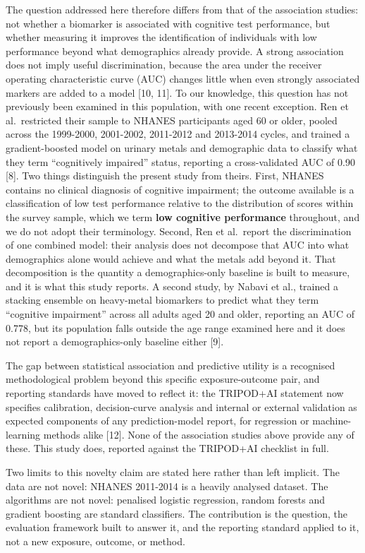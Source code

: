 \documentclass[12pt]{article}
\begin{document}
The question addressed here therefore differs from that of the association studies: not whether a biomarker is associated with cognitive test performance, but whether measuring it improves the identification of individuals with low performance beyond what demographics already provide. A strong association does not imply useful discrimination, because the area under the receiver operating characteristic curve (AUC) changes little when even strongly associated markers are added to a model [10, 11]. To our knowledge, this question has not previously been examined in this population, with one recent exception. Ren et al.\ restricted their sample to NHANES participants aged 60 or older, pooled across the 1999-2000, 2001-2002, 2011-2012 and 2013-2014 cycles, and trained a gradient-boosted model on urinary metals and demographic data to classify what they term ``cognitively impaired'' status, reporting a cross-validated AUC of 0.90 [8]. Two things distinguish the present study from theirs. First, NHANES contains no clinical diagnosis of cognitive impairment; the outcome available is a classification of low test performance relative to the distribution of scores within the survey sample, which we term \textbf{low cognitive performance} throughout, and we do not adopt their terminology. Second, Ren et al.\ report the discrimination of one combined model: their analysis does not decompose that AUC into what demographics alone would achieve and what the metals add beyond it. That decomposition is the quantity a demographics-only baseline is built to measure, and it is what this study reports. A second study, by Nabavi et al., trained a stacking ensemble on heavy-metal biomarkers to predict what they term ``cognitive impairment'' across all adults aged 20 and older, reporting an AUC of 0.778, but its population falls outside the age range examined here and it does not report a demographics-only baseline either [9].

The gap between statistical association and predictive utility is a recognised methodological problem beyond this specific exposure-outcome pair, and reporting standards have moved to reflect it: the TRIPOD+AI statement now specifies calibration, decision-curve analysis and internal or external validation as expected components of any prediction-model report, for regression or machine-learning methods alike [12]. None of the association studies above provide any of these. This study does, reported against the TRIPOD+AI checklist in full.

Two limits to this novelty claim are stated here rather than left implicit. The data are not novel: NHANES 2011-2014 is a heavily analysed dataset. The algorithms are not novel: penalised logistic regression, random forests and gradient boosting are standard classifiers. The contribution is the question, the evaluation framework built to answer it, and the reporting standard applied to it, not a new exposure, outcome, or method.
\end{document}

